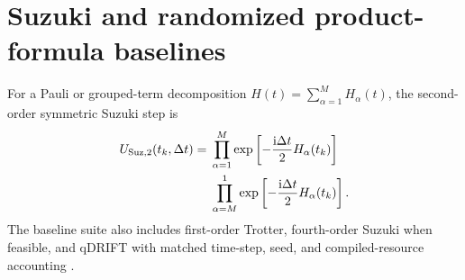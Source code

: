 \documentclass[
  reprint,
  amsmath,
  amssymb,
  aps,
  pra,
  nofootinbib,
  superscriptaddress,
  floatfix
]{revtex4-2}
\newcommand{\placeholder}[1]{\textcolor{red!70!black}{\ifmmode\left[#1\right]\else\textsf{[#1]}\fi}}
\newcommand{\ii}{\mathrm{i}}
\begin{document}
\section{Suzuki and randomized product-formula baselines}
\label{app:product_formula}

For a Pauli or grouped-term decomposition $H(t)=\sum_{\alpha=1}^{M}H_{\alpha}(t)$, the second-order symmetric Suzuki step is \cite{Suzuki1985,Suzuki1990}
\begin{equation}
\begin{split}
U_{{\rm Suz},2}(t_k,\Delta t)={}&\prod_{\alpha=1}^{M}\exp\left[-\frac{\ii\Delta t}{2}H_{\alpha}(t_k)\right]\\
&\prod_{\alpha=M}^{1}\exp\left[-\frac{\ii\Delta t}{2}H_{\alpha}(t_k)\right].
\end{split}
\label{eq:suzuki2_generic}
\end{equation}
The baseline suite also includes first-order Trotter, fourth-order Suzuki when feasible, and qDRIFT with matched time-step, seed, and compiled-resource accounting \cite{ChildsSu2019ProductFormula,ChildsOstranderSu2019RandomizedPF,Campbell2019QDRIFT}.
\end{document}

